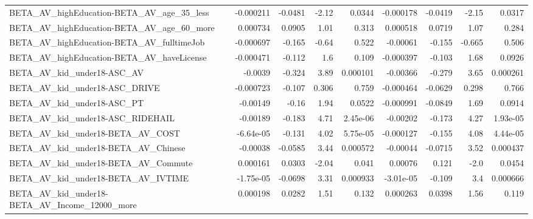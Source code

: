 \begin{tabular}{lrrrrrrrr}
BETA\_AV\_highEducation-BETA\_AV\_age\_35\_less          &   -0.000211 &      -0.0481 &     -2.12 &   0.0344 &  -0.000178 &     -0.0419 &        -2.15 &        0.0317 \\
BETA\_AV\_highEducation-BETA\_AV\_age\_60\_more          &    0.000734 &       0.0905 &      1.01 &    0.313 &   0.000518 &      0.0719 &         1.07 &         0.284 \\
BETA\_AV\_highEducation-BETA\_AV\_fulltimeJob          &   -0.000697 &       -0.165 &     -0.64 &    0.522 &   -0.00061 &      -0.155 &       -0.665 &         0.506 \\
BETA\_AV\_highEducation-BETA\_AV\_haveLicense          &   -0.000471 &       -0.112 &       1.6 &    0.109 &  -0.000397 &      -0.103 &         1.68 &        0.0926 \\
BETA\_AV\_kid\_under18-ASC\_AV                         &     -0.0039 &       -0.324 &      3.89 & 0.000101 &   -0.00366 &      -0.279 &         3.65 &      0.000261 \\
BETA\_AV\_kid\_under18-ASC\_DRIVE                      &   -0.000723 &       -0.107 &     0.306 &    0.759 &  -0.000464 &     -0.0629 &        0.298 &         0.766 \\
BETA\_AV\_kid\_under18-ASC\_PT                         &    -0.00149 &        -0.16 &      1.94 &   0.0522 &  -0.000991 &     -0.0849 &         1.69 &        0.0914 \\
BETA\_AV\_kid\_under18-ASC\_RIDEHAIL                   &    -0.00189 &       -0.183 &      4.71 & 2.45e-06 &   -0.00202 &      -0.173 &         4.27 &      1.93e-05 \\
BETA\_AV\_kid\_under18-BETA\_AV\_COST                   &   -6.64e-05 &       -0.131 &      4.02 & 5.75e-05 &  -0.000127 &      -0.155 &         4.08 &      4.44e-05 \\
BETA\_AV\_kid\_under18-BETA\_AV\_Chinese                &    -0.00038 &      -0.0585 &      3.44 & 0.000572 &   -0.00044 &     -0.0715 &         3.52 &      0.000437 \\
BETA\_AV\_kid\_under18-BETA\_AV\_Commute                &    0.000161 &       0.0303 &     -2.04 &    0.041 &    0.00076 &       0.121 &         -2.0 &        0.0454 \\
BETA\_AV\_kid\_under18-BETA\_AV\_IVTIME                 &   -1.75e-05 &      -0.0698 &      3.31 & 0.000933 &  -3.01e-05 &      -0.109 &          3.4 &      0.000666 \\
BETA\_AV\_kid\_under18-BETA\_AV\_Income\_12000\_more      &    0.000198 &       0.0282 &      1.51 &    0.132 &   0.000263 &      0.0398 &         1.56 &         0.119 \\

\end{tabular}
